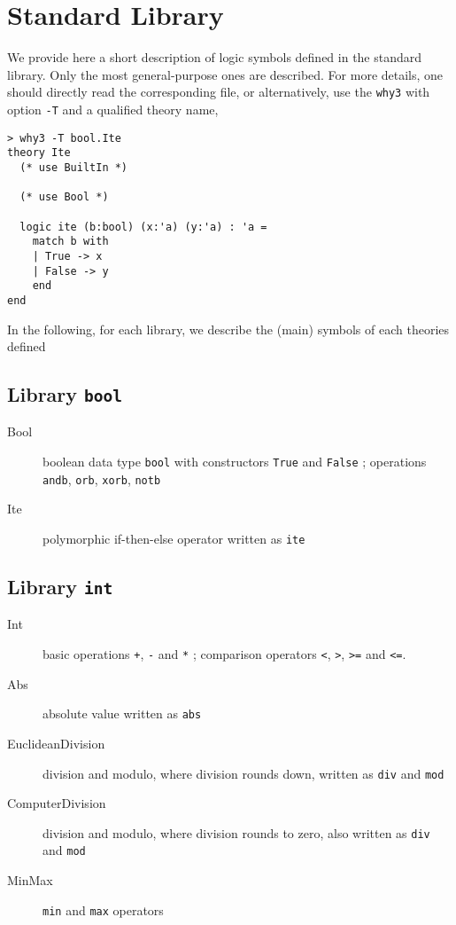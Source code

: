 \chapter{Standard Library}
\label{chap:library}

We provide here a short description of logic symbols defined in the
standard library. Only the most general-purpose ones are
described. For more details, one should directly read the
corresponding file, or alternatively, use the \verb|why3| with option \verb|-T| and a qualified theory name, \eg
\begin{verbatim}
> why3 -T bool.Ite
theory Ite
  (* use BuiltIn *)
  
  (* use Bool *)
  
  logic ite (b:bool) (x:'a) (y:'a) : 'a =
    match b with
    | True -> x
    | False -> y
    end
end
\end{verbatim}

In the following, for each library, we describe the (main) symbols of
each theories defined

\section{Library \texttt{bool}}

\begin{description}

\item[Bool] boolean data type \verb|bool| with constructors \verb|True| and
  \verb|False| ; operations \verb|andb|, \verb|orb|, \verb|xorb|, \verb|notb|

\item[Ite] polymorphic if-then-else operator written as \verb|ite|

\end{description}

\section{Library \texttt{int}}

\begin{description}

\item[Int] basic operations \verb|+|, \verb|-| and \verb|*| ; comparison
  operators \verb|<|, \verb|>|, \verb|>=| and \verb|<=|.

\item[Abs] absolute value written as \verb|abs|

\item[EuclideanDivision] division and modulo, where division rounds
  down, written as \verb|div| and \verb|mod|

\item[ComputerDivision] division and modulo, where division rounds to
  zero, also written as \verb|div| and \verb|mod|

\item[MinMax] \verb|min| and \verb|max| operators

\end{description}

